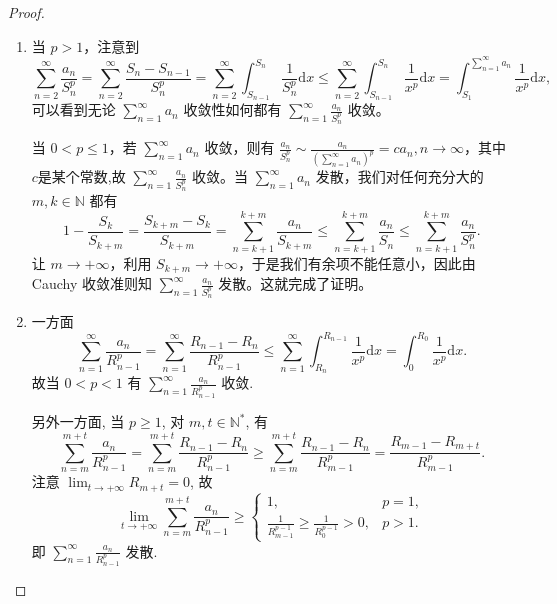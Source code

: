 \documentclass[../../main.tex]{subfiles}%
\begin{document}
\begin{proof}
\begin{enumerate}[(1)]
\item 当 \( p > 1 \)，注意到
\[
\sum_{n = 2}^{\infty} \frac{a_n}{S_n^p} = \sum_{n = 2}^{\infty} \frac{S_n - S_{n - 1}}{S_n^p} = \sum_{n = 2}^{\infty} \int_{S_{n - 1}}^{S_n} \frac{1}{S_n^p} \mathrm{d}x \leqslant \sum_{n = 2}^{\infty} \int_{S_{n - 1}}^{S_n} \frac{1}{x^p} \mathrm{d}x = \int_{S_1}^{\sum\limits_{n = 1}^{\infty} a_n} \frac{1}{x^p} \mathrm{d}x,
\]
可以看到无论 \( \sum_{n = 1}^{\infty} a_n \) 收敛性如何都有 \( \sum_{n = 1}^{\infty} \frac{a_n}{S_n^p} \) 收敛。

当 \( 0 < p \leqslant 1 \)，若 \( \sum_{n = 1}^{\infty} a_n \) 收敛，则有 \( \frac{a_n}{S_n^p} \sim \frac{a_n}{\left( \sum\limits_{n = 1}^{\infty} a_n \right)^p}=ca_n, n \to \infty \)，其中$c$是某个常数,故 \( \sum_{n = 1}^{\infty} \frac{a_n}{S_n^p} \) 收敛。当 \( \sum_{n = 1}^{\infty} a_n \) 发散，我们对任何充分大的 \( m, k \in \mathbb{N} \) 都有
\[
1 - \frac{S_k}{S_{k + m}} = \frac{S_{k + m} - S_k}{S_{k + m}} = \sum_{n = k + 1}^{k + m} \frac{a_n}{S_{k + m}} \leqslant \sum_{n = k + 1}^{k + m} \frac{a_n}{S_n} \leqslant \sum_{n = k + 1}^{k + m} \frac{a_n}{S_n^p}.
\]
让 \( m \to +\infty \)，利用 \( S_{k + m} \to +\infty \)，于是我们有余项不能任意小，因此由 Cauchy 收敛准则知 \( \sum_{n = 1}^{\infty} \frac{a_n}{S_n^p} \) 发散。这就完成了证明。

\item 一方面
\[
\sum_{n=1}^{\infty} \frac{a_n}{R_{n-1}^p} = \sum_{n=1}^{\infty} \frac{R_{n-1} - R_n}{R_{n-1}^p} \leqslant \sum_{n=1}^{\infty} \int_{R_n}^{R_{n-1}} \frac{1}{x^p} \mathrm{d}x = \int_{0}^{R_0} \frac{1}{x^p} \mathrm{d}x.
\]
故当 \( 0 < p < 1 \) 有 \( \sum_{n=1}^{\infty} \frac{a_n}{R_{n-1}^p} \) 收敛.

另外一方面, 当 \( p \geqslant 1 \), 对 \( m,t \in \mathbb{N}^* \), 有
\[
\sum_{n=m}^{m+t} \frac{a_n}{R_{n-1}^p} = \sum_{n=m}^{m+t} \frac{R_{n-1} - R_n}{R_{n-1}^p} \geqslant \sum_{n=m}^{m+t} \frac{R_{n-1} - R_n}{R_{m-1}^p} = \frac{R_{m-1} - R_{m+t}}{R_{m-1}^p}.
\]
注意 \( \lim_{t \to +\infty} R_{m+t} = 0 \), 故
\[
\lim_{t \to +\infty} \sum_{n=m}^{m+t} \frac{a_n}{R_{n-1}^p} \geqslant \begin{cases}
1, & p = 1, \\
\frac{1}{R_{m-1}^{p-1}} \geqslant \frac{1}{R_0^{p-1}} > 0, & p > 1.
\end{cases}
\]
即 \( \sum_{n=1}^{\infty} \frac{a_n}{R_{n-1}^p} \) 发散.
\end{enumerate}
\end{proof}
\end{document}
